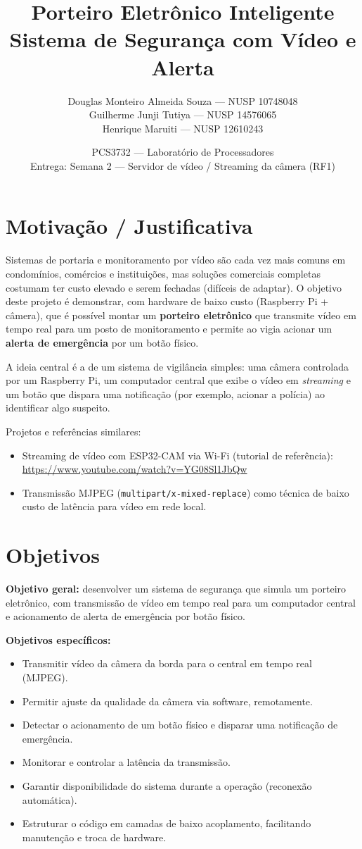 \documentclass[12pt,a4paper]{article}
\title{Porteiro Eletrônico Inteligente\\[2pt]
\large Sistema de Segurança com Vídeo e Alerta}
\author{%
Douglas Monteiro Almeida Souza — NUSP 10748048 \\
Guilherme Junji Tutiya — NUSP 14576065 \\
Henrique Maruiti — NUSP 12610243}
\date{PCS3732 — Laboratório de Processadores \\
Entrega: Semana 2 — Servidor de vídeo / Streaming da câmera (RF1)}
\begin{document}
\maketitle

\section{Motivação / Justificativa}

Sistemas de portaria e monitoramento por vídeo são cada vez mais comuns em
condomínios, comércios e instituições, mas soluções comerciais completas
costumam ter custo elevado e serem fechadas (difíceis de adaptar). O objetivo
deste projeto é demonstrar, com hardware de baixo custo (Raspberry Pi + câmera),
que é possível montar um \textbf{porteiro eletrônico} que transmite vídeo em
tempo real para um posto de monitoramento e permite ao vigia acionar um
\textbf{alerta de emergência} por um botão físico.

A ideia central é a de um sistema de vigilância simples: uma câmera controlada
por um Raspberry Pi, um computador central que exibe o vídeo em \textit{streaming}
e um botão que dispara uma notificação (por exemplo, acionar a polícia) ao
identificar algo suspeito.

Projetos e referências similares:
\begin{itemize}[nosep]
  \item Streaming de vídeo com ESP32-CAM via Wi-Fi (tutorial de referência):
        \url{https://www.youtube.com/watch?v=YG08Sl1JbQw}
  \item Transmissão MJPEG (\texttt{multipart/x-mixed-replace}) como técnica de
        baixo custo de latência para vídeo em rede local.
\end{itemize}

\section{Objetivos}

\textbf{Objetivo geral:} desenvolver um sistema de segurança que simula um
porteiro eletrônico, com transmissão de vídeo em tempo real para um computador
central e acionamento de alerta de emergência por botão físico.

\textbf{Objetivos específicos:}
\begin{itemize}[nosep]
  \item Transmitir vídeo da câmera da borda para o central em tempo real (MJPEG).
  \item Permitir ajuste da qualidade da câmera via software, remotamente.
  \item Detectar o acionamento de um botão físico e disparar uma notificação de
        emergência.
  \item Monitorar e controlar a latência da transmissão.
  \item Garantir disponibilidade do sistema durante a operação (reconexão
        automática).
  \item Estruturar o código em camadas de baixo acoplamento, facilitando
        manutenção e troca de hardware.
\end{itemize}
\end{document}
